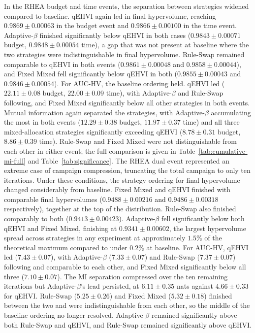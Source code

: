 In the RHEA budget and time events, the separation between strategies widened compared to baseline. qEHVI again led in final hypervolume, reaching $0.9869 \pm 0.00063$ in the budget event and $0.9866 \pm 0.00100$ in the time event. Adaptive-$\beta$ finished significantly below qEHVI in both cases ($0.9843 \pm 0.00071$ budget, $0.9848 \pm 0.00054$ time), a gap that was not present at baseline where the two strategies were indistinguishable in final hypervolume. Rule-Swap remained comparable to qEHVI in both events ($0.9861 \pm 0.00048$ and $0.9858 \pm 0.00044$), and Fixed Mixed fell significantly below qEHVI in both ($0.9855 \pm 0.00043$ and $0.9846 \pm 0.00054$). For AUC-HV, the baseline ordering held. qEHVI led ($22.11 \pm 0.08$ budget, $22.00 \pm 0.09$ time), with Adaptive-$\beta$ and Rule-Swap following, and Fixed Mixed significantly below all other strategies in both events. Mutual information again separated the strategies, with Adaptive-$\beta$ accumulating the most in both events ($12.29 \pm 0.38$ budget, $11.97 \pm 0.37$ time) and all three mixed-allocation strategies significantly exceeding qEHVI ($8.78 \pm 0.31$ budget, $8.86 \pm 0.39$ time). Rule-Swap and Fixed Mixed were not distinguishable from each other in either event; the full comparison is given in Table~\ref{tab:cumulative-mi-full} and Table~\ref{tab:significance}.
The RHEA dual event represented an extreme case of campaign compression, truncating the total campaign to only ten iterations. Under these conditions, the strategy ordering for final hypervolume changed considerably from baseline. Fixed Mixed and qEHVI finished with comparable final hypervolumes ($0.9488 \pm 0.00216$ and $0.9486 \pm 0.00318$ respectively), together at the top of the distribution. Rule-Swap also finished comparably to both ($0.9413 \pm 0.00423$). Adaptive-$\beta$ fell significantly below both qEHVI and Fixed Mixed, finishing at $0.9341 \pm 0.00602$, the largest hypervolume spread across strategies in any experiment at approximately $1.5\%$ of the theoretical maximum compared to under $0.2\%$ at baseline. For AUC-HV, qEHVI led ($7.43 \pm 0.07$), with Adaptive-$\beta$ ($7.33 \pm 0.07$) and Rule-Swap ($7.37 \pm 0.07$) following and comparable to each other, and Fixed Mixed significantly below all three ($7.10 \pm 0.07$). The MI separation compressed over the ten remaining iterations but Adaptive-$\beta$'s lead persisted, at $6.11 \pm 0.35$ nats against $4.66 \pm 0.33$ for qEHVI. Rule-Swap ($5.25 \pm 0.26$) and Fixed Mixed ($5.32 \pm 0.18$) finished between the two and were indistinguishable from each other, so the middle of the baseline ordering no longer resolved. Adaptive-$\beta$ remained significantly above both Rule-Swap and qEHVI, and Rule-Swap remained significantly above qEHVI.

